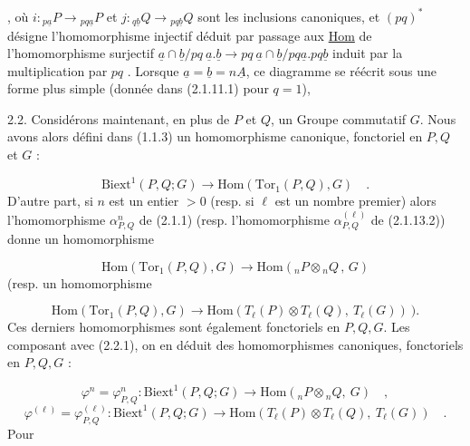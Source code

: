 ,
où $i : {}_{p\underline{a}}P \longrightarrow {}_{pq\underline{a}}P$ et $j : {}_{q\underline{b}}Q \longrightarrow {}_{pq\underline{b}}Q$ sont les inclusions canoniques, et $(pq)^{*}$ désigne l'homomorphisme injectif déduit par passage aux \underline{Hom} de l'homomorphisme surjectif $\underline{a}\cap\underline{b}/pq\ \underline{a}.\underline{b} \longrightarrow pq\ \underline{a}\cap\underline{b}/pq\underline{a}.pq\underline{b}$ induit par la multiplication par $pq$ . Lorsque $\underline{a} = \underline{b} = n\underline{A}$, ce diagramme se réécrit sous une forme plus simple (donnée dans (2.1.11.1) pour $q = 1$),

2.2. Considérons maintenant, en plus de $P$ et $Q$, un Groupe commutatif $G$. Nous avons alors défini dans (1.1.3) un homomorphisme canonique, fonctoriel en $P,Q$ et $G$ :

\begin{equation}\tag{2.2.1}
\mathrm{Biext}^1(P,Q;G) \longrightarrow \mathrm{Hom}(\mathrm{Tor}_1(P,Q),G) \quad .
\end{equation}
D'autre part, si $n$ est un entier $> 0$ (resp. si $\ell$ est un nombre premier) alors l'homomorphisme $\alpha^n_{P,Q}$ de (2.1.1) (resp. l'homomorphisme $\alpha^{(\ell)}_{P,Q}$ de (2.1.13.2)) donne un homomorphisme

\begin{equation*}
\mathrm{Hom}(\mathrm{Tor}_1(P,Q),G) \longrightarrow \mathrm{Hom}({}_nP \otimes {}_nQ \, , \, G)
\end{equation*}
(resp. un homomorphisme

\begin{equation*}
\mathrm{Hom}(\mathrm{Tor}_1(P,Q),G) \longrightarrow \mathrm{Hom}(T_{\ell}(P) \otimes T_{\ell}(Q), \ T_{\ell}(G)) \ ).
\end{equation*}
Ces derniers homomorphismes sont également fonctoriels en $P,Q,G$. Les composant avec (2.2.1), on en déduit des homomorphismes canoniques, fonctoriels en $P,Q,G$ :

\begin{equation}\tag{2.2.2}
\varphi^n = \varphi^n_{P,Q} : \mathrm{Biext}^1(P,Q;G) \longrightarrow \mathrm{Hom}({}_nP{\otimes}{}_nQ, \ G) \quad ,
\end{equation}
\begin{equation}\tag{2.2.3}
\varphi^{(\ell)} = \varphi^{(\ell)}_{P,Q} : \mathrm{Biext}^1(P,Q;G) \longrightarrow \mathrm{Hom}(T_{\ell}(P){\otimes}T_{\ell}(Q), \ T_{\ell}(G)) \quad .
\end{equation}
Pour

